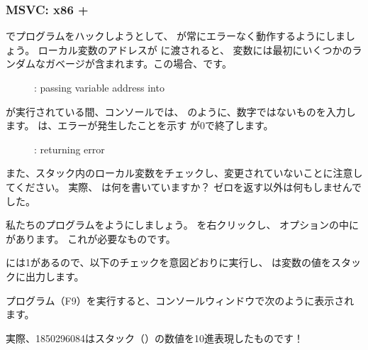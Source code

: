 \clearpage
\subsubsection{MSVC: x86 + \olly}

\olly でプログラムをハックしようとして、 \scanf が常にエラーなく動作するようにしましょう。 
ローカル変数のアドレスが \scanf に渡されると、
変数には最初にいくつかのランダムなガベージが含まれます。この場合、です。

\begin{figure}[H]
\centering
{}
\caption{\olly: passing variable address into \scanf}
\label{fig:scanf_ex3_olly_1}
\end{figure}

\clearpage
\scanf が実行されている間、コンソールでは、 のように、数字ではないものを入力します。 
\scanf は、エラーが発生したことを示す \EAX が0で終了します。

\begin{figure}[H]
\centering
{}
\caption{\olly: \scanf returning error}
\label{fig:scanf_ex3_olly_2}
\end{figure}

また、スタック内のローカル変数をチェックし、変更されていないことに注意してください。 
実際、 \scanf は何を書いていますか？ 
ゼロを返す以外は何もしませんでした。

私たちのプログラムをようにしましょう。 
\EAX を右クリックし、
オプションの中にがあります。 
これが必要なものです。

\EAX には1があるので、以下のチェックを意図どおりに実行し、
\printf は変数の値をスタックに出力します。 

プログラム（F9）を実行すると、コンソールウィンドウで次のように表示されます。



実際、1850296084はスタック（）の数値を10進表現したものです！
